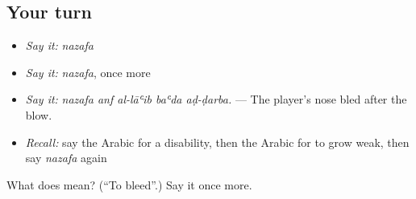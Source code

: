 \subsection*{Your turn}
\begin{itemize}
\raggedright
  \item \emph{Say it:} \emph{nazafa}
  \item \emph{Say it:} \emph{nazafa}, once more
  \item \emph{Say it:} \emph{nazafa anf al-lāʿib baʿda aḍ-ḍarba.} — The player's nose bled after the blow.
  \item \emph{Recall:} say the Arabic for a disability, then the Arabic for to grow weak, then say \emph{nazafa} again
\end{itemize}

\begin{tcolorbox}[breakable,colback=teal!4,colframe=teal!35!black,title={Before you move on}]
What does  mean? (\textquotedblleft{}To bleed\textquotedblright{}.) Say it once more.
\end{tcolorbox}
